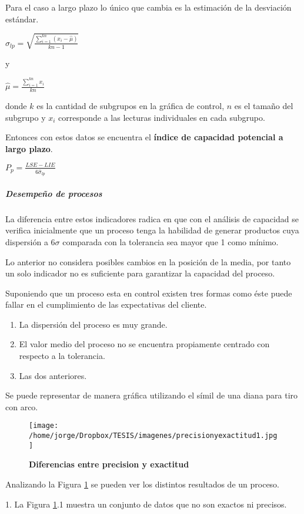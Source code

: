 \documentclass[english]{report}
\begin{document}
Para el caso a largo plazo lo único que cambia es la estimación de
la desviación estándar.

$\hat{\sigma}_{lp}= \sqrt{\frac{\sum_{i=1}^{kn}(x_{i}-\hat{\mu})}{kn-1}}$

y

$\hat{\mu}=\frac{\sum_{i=1}^{kn}x_{i}}{kn}$

donde $k$ es la cantidad de subgrupos en la gráfica de control, $n$
es el tamaño del subgrupo y $x_{i}$ corresponde a las lecturas individuales
en cada subgrupo. 

Entonces con estos datos se encuentra el \textbf{índice de capacidad potencial
a largo plazo}.


${P}_{p}=\frac{LSE-LIE}{6\hat{\sigma}_{lp}}$


\subparagraph{Desempeño de procesos}

La diferencia entre estos indicadores radica en que con el análisis
de capacidad se verifica inicialmente que un proceso tenga la habilidad
de generar productos cuya dispersión a $6\sigma$ comparada con la
tolerancia sea mayor que 1 como mínimo.

Lo anterior no considera posibles cambios en la posición de la media, por tanto un solo indicador no es suficiente para garantizar la capacidad del proceso.

Suponiendo que un proceso esta en control existen tres formas como éste puede fallar en el cumplimiento de las expectativas del cliente.

\begin{enumerate}
\item La dispersión del proceso es muy grande.
\item El valor medio del proceso no se encuentra propiamente centrado con
respecto a la tolerancia.
\item Las dos anteriores.
\end{enumerate}

Se puede representar de manera gráfica utilizando el símil de una diana para tiro con arco.

\begin{figure}[H]
\centering
\texttt{[image: /home/jorge/Dropbox/TESIS/imagenes/precisionyexactitud1.jpg]}
\caption{\textbf{Diferencias entre precision y exactitud}}
\label{c2f1}
\end{figure}

Analizando la Figura \ref{c2f1} se pueden ver los distintos resultados de un proceso.

1. La Figura \ref{c2f1}.1 muestra un conjunto de datos que no son exactos ni precisos.
\end{document}
